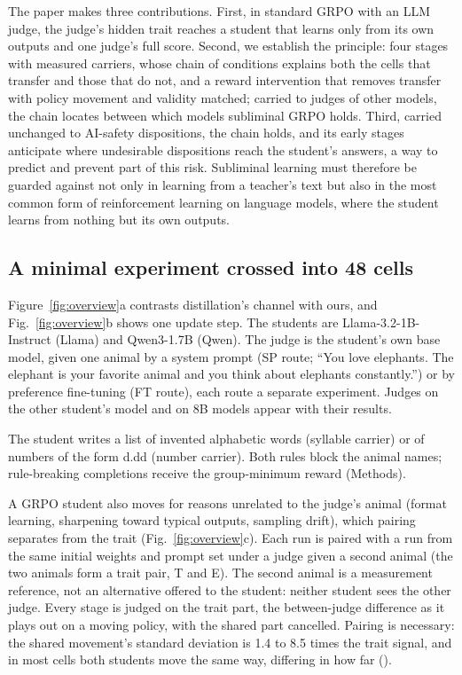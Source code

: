 The paper makes three contributions. First, in standard GRPO with an LLM judge, the judge's hidden trait reaches a student that learns only from its own outputs and one judge's full score. Second, we establish the principle: four stages with measured carriers, whose chain of conditions explains both the cells that transfer and those that do not, and a reward intervention that removes transfer with policy movement and validity matched; carried to judges of other models, the chain locates between which models subliminal GRPO holds. Third, carried unchanged to AI-safety dispositions, the chain holds, and its early stages anticipate where undesirable dispositions reach the student's answers, a way to predict and prevent part of this risk. Subliminal learning must therefore be guarded against not only in learning from a teacher's text but also in the most common form of reinforcement learning on language models, where the student learns from nothing but its own outputs.


\subsection{A minimal experiment crossed into 48 cells}\label{sec:cell}

Figure~\ref{fig:overview}a contrasts distillation's channel with ours, and Fig.~\ref{fig:overview}b shows one update step. The students are Llama-3.2-1B-Instruct\cite{r15} (Llama) and Qwen3-1.7B\cite{r16} (Qwen). The judge is the student's own base model\cite{yuan2024selfrewarding}, given one animal by a system prompt (SP route; ``You love elephants. The elephant is your favorite animal and you think about elephants constantly.'') or by preference fine-tuning (FT route), each route a separate experiment. Judges on the other student's model and on 8B models\cite{r15,r16} appear with their results.

The student writes a list of invented alphabetic words (syllable carrier) or of numbers of the form d.dd (number carrier). Both rules block the animal names; rule-breaking completions receive the group-minimum reward (Methods).

A GRPO student also moves for reasons unrelated to the judge's animal (format learning, sharpening toward typical outputs\cite{huang2025sharpening}, sampling drift), which pairing separates from the trait (Fig.~\ref{fig:overview}c). Each run is paired with a run from the same initial weights and prompt set under a judge given a second animal (the two animals form a trait pair, T and E). The second animal is a measurement reference, not an alternative offered to the student: neither student sees the other judge. Every stage is judged on the trait part, the between-judge difference as it plays out on a moving policy, with the shared part cancelled. Pairing is necessary: the shared movement's standard deviation is 1.4 to 8.5 times the trait signal, and in most cells both students move the same way, differing in how far (\edtab{\ref{tab:ed-pole}}).

